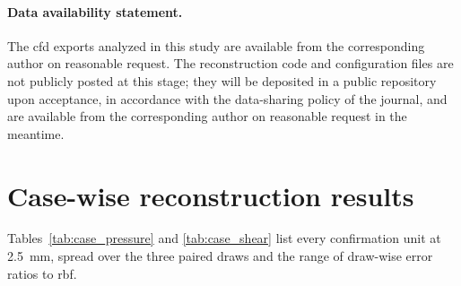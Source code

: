 \documentclass[12pt,a4paper]{article}
\newcommand{\CFD}{\ac{cfd}\xspace}
\newcommand{\RBF}{\ac{rbf}\xspace}
\theoremstyle{definition}
\numberwithin{equation}{section}
\begin{document}
\paragraph{Data availability statement.} The \CFD exports analyzed in this study are available from the corresponding author on reasonable request. The reconstruction code and configuration files are not publicly posted at this stage; they will be deposited in a public repository upon acceptance, in accordance with the data-sharing policy of the journal, and are available from the corresponding author on reasonable request in the meantime.
\appendix
\section{Case-wise reconstruction results}
\label{app:casewise}
Tables~\ref{tab:case_pressure} and \ref{tab:case_shear} list every confirmation unit at 2.5~mm, spread over the three paired draws and the range of draw-wise error ratios to \RBF.




\newpage


\end{document}
